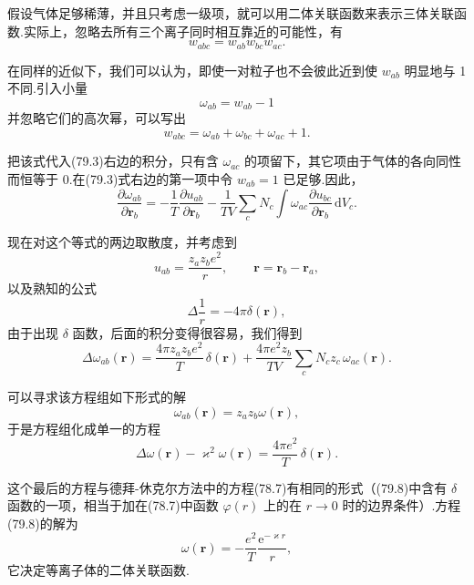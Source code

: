 假设气体足够稀薄，并且只考虑一级项，就可以用二体关联函数来表示三体关联函数.实际上，忽略去所有三个离子同时相互靠近的可能性，有
\begin{equation*}
  w_{abc}=w_{ab}w_{bc}w_{ac}.
\end{equation*}

在同样的近似下，我们可以认为，即使一对粒子也不会彼此近到使 $w_{ab}$ 明显地与 1 不同.引入小量
\begin{equation}
  \omega_{ab}=w_{ab}-1
\end{equation}
并忽略它们的高次幂，可以写出
\begin{equation}
  w_{abc}=\omega_{ab}+\omega_{bc}+\omega_{ac}+1.
\end{equation}

把该式代入(79.3)右边的积分，只有含 $\omega_{ac}$ 的项留下，其它项由于气体的各向同性而恒等于 0.在(79.3)式右边的第一项中令 $w_{ab}=1$ 已足够.因此，
\begin{equation*}
  \frac{\partial\omega_{ab}}{\partial\boldsymbol{r}_b}
  =-\frac{1}{T}\frac{\partial u_{ab}}{\partial\boldsymbol{r}_b}
  -\frac{1}{TV}\sum_cN_c\int\omega_{ac}
  \frac{\partial u_{bc}}{\partial\boldsymbol{r}_b}\,\mathrm{d}V_c.
\end{equation*}

现在对这个等式的两边取散度，并考虑到
\begin{equation*}
  u_{ab}=\frac{z_az_be^2}{r},\qquad
  \boldsymbol{r}=\boldsymbol{r}_b-\boldsymbol{r}_a,
\end{equation*}
以及熟知的公式
\begin{equation*}
  \Delta\frac{1}{r}=-4\pi\delta(\boldsymbol{r}),
\end{equation*}
由于出现 $\delta$ 函数，后面的积分变得很容易，我们得到
\begin{equation}
  \Delta\omega_{ab}(\boldsymbol{r})=\frac{4\pi z_az_be^2}{T}\,\delta(\boldsymbol{r})
  +\frac{4\pi e^2z_b}{TV}\sum_cN_cz_c\,\omega_{ac}(\boldsymbol{r}).
\end{equation}

可以寻求该方程组如下形式的解
\begin{equation}
  \omega_{ab}(\boldsymbol{r})=z_az_b\omega(\boldsymbol{r}),
\end{equation}
于是方程组化成单一的方程
\begin{equation}
  \Delta\omega(\boldsymbol{r})-\varkappa^2\omega(\boldsymbol{r})
  =\frac{4\pi e^2}{T}\,\delta(\boldsymbol{r}).
\end{equation}

这个最后的方程与德拜-休克尔方法中的方程(78.7)有相同的形式（(79.8)中含有 $\delta$ 函数的一项，相当于加在(78.7)中函数 $\varphi(r)$ 上的在 $r\to0$ 时的边界条件）.方程(79.8)的解为
\begin{equation}
  \omega(\boldsymbol{r})=-\frac{e^2}{T}\frac{\mathrm{e}^{-\varkappa r}}{r},
\end{equation}
它决定等离子体的二体关联函数.

